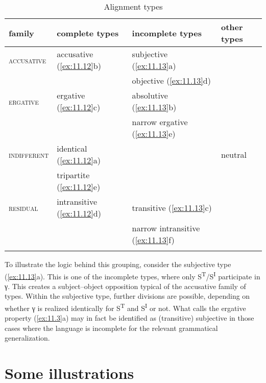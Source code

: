 \documentclass[output=paper]{langsci/langscibook}
\begin{document}
\begin{table}
\caption{Alignment types\label{tab:fromex:11.14}}
    \begin{tabular}{llll}
    \lsptoprule
    family               & complete types                  & incomplete types          & other types \\
    \midrule
    \textsc{accusative}  & accusative (\ref{ex:11.12}b)   & subjective (\ref{ex:11.13}a)          & \\
                         &                                 & objective  (\ref{ex:11.13}d)          & \\
    \textsc{ergative}    & ergative (\ref{ex:11.12}c)  & absolutive (\ref{ex:11.13}b)          & \\
                         &                                 & narrow ergative (\ref{ex:11.13}e)     & \\
    \textsc{indifferent} & identical (\ref{ex:11.12}a)    & & neutral \\
                         & tripartite (\ref{ex:11.12}e)                &                           & \\
    \textsc{residual}    & intransitive (\ref{ex:11.12}d) & transitive (\ref{ex:11.13}c)          & \\
                         &                                 & narrow intransitive (\ref{ex:11.13}f) & \\
    \lspbottomrule
    \end{tabular}
\end{table}

To illustrate the logic behind this grouping, consider the subjective type
(\ref{ex:11.13}a). This is one of the incomplete types, where only
S\textsuperscript{T}/S\textsuperscript{I} participate in γ. This creates a
subject--object opposition typical of the accusative family of types. Within the
subjective type, further divisions are possible, depending on whether γ is
realized identically for S\textsuperscript{T} and S\textsuperscript{I} or not.
What \citet{Deal2015} calls the ergative property (\ref{ex:11.3}a) may in fact be
identified as (transitive) subjective in those cases where the language is
incomplete for the relevant grammatical generalization.

\section{Some illustrations}\label{sec:11.4}
\end{document}
